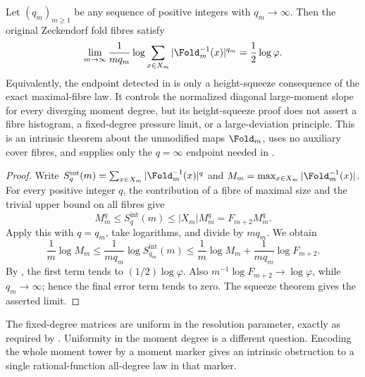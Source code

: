 \begin{theorem}
\label{thm:diagonal-zero-temperature-fold-endpoint}
\label{thm:diagonal-height-endpoint}
Let \((q_m)_{m\ge1}\) be any sequence of positive integers with
\(q_m\to\infty\).  Then the original Zeckendorf fold fibres satisfy
\[
  \lim_{m\to\infty}\frac{1}{m q_m}
  \log\sum_{x\in X_m}|\Fold_m^{-1}(x)|^{q_m}
  ={\frac12}\log\varphi .
\]
Equivalently, the endpoint detected in 
is only a height-squeeze consequence of the exact maximal-fibre law.  It controls
the normalized diagonal large-moment slope for every diverging moment degree, but
its height-squeeze proof does not assert a fibre histogram, a fixed-degree
pressure limit, or a large-deviation principle.
This is an intrinsic theorem about the unmodified maps \(\Fold_m\), uses no
auxiliary cover fibres, and supplies only the \(q=\infty\) endpoint needed in
.
\end{theorem}

\begin{proof}
Write
\(S_q^{\mathrm{int}}(m)=\sum_{x\in X_m}|\Fold_m^{-1}(x)|^q\) and
\(M_m=\max_{x\in X_m}|\Fold_m^{-1}(x)|\).  For every positive integer \(q\),
the contribution of a fibre of maximal size and the trivial upper bound on all
fibres give
\[
  M_m^q\le S_q^{\mathrm{int}}(m)\le |X_m|M_m^q=F_{m+2}M_m^q .
\]
Apply this with \(q=q_m\), take logarithms, and divide by \(m q_m\).  We obtain
\[
  \frac1m\log M_m
  \le
  \frac{1}{m q_m}\log S_{q_m}^{\mathrm{int}}(m)
  \le
  \frac1m\log M_m+\frac{1}{m q_m}\log F_{m+2} .
\]
By , the first term tends to
\((1/2)\log\varphi\).  Also
\(m^{-1}\log F_{m+2}\to\log\varphi\), while \(q_m\to\infty\); hence the final
error term tends to zero.  The squeeze theorem gives the asserted limit.
\end{proof}

The fixed-degree matrices are uniform in the resolution parameter, exactly as
required by .  Uniformity in the moment
degree is a different question.  Encoding the whole moment tower by a moment
marker gives an intrinsic obstruction to a single rational-function all-degree
law in that marker.


